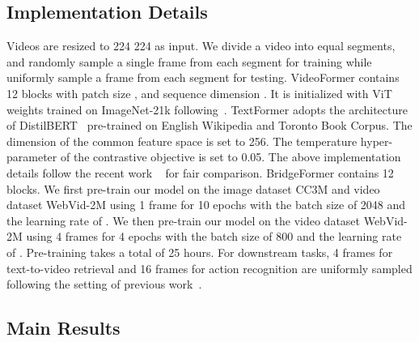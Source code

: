 \documentclass[10pt,twocolumn,letterpaper]{article}
\begin{document}
\subsection{Implementation Details}
Videos are resized to 224  224 as input. We divide a video into  equal segments, and randomly sample a single frame from each segment for training while uniformly sample a frame from each segment for testing. VideoFormer contains 12 blocks with patch size , and sequence dimension . It is initialized with ViT~\cite{vit} weights trained on ImageNet-21k following~\cite{frozen}. TextFormer adopts the architecture of DistilBERT~\cite{distilbert} pre-trained on English Wikipedia and Toronto Book Corpus.  The dimension of the common feature space is set to 256. The temperature hyper-parameter of the contrastive objective is set to 0.05. The above implementation details follow the recent work ~\cite{frozen} for fair comparison. BridgeFormer contains 12 blocks. We first pre-train our model on the image dataset CC3M and video dataset WebVid-2M using 1 frame for 10 epochs with the batch size of 2048 and the learning rate of . We then pre-train our model on the video dataset WebVid-2M using 4 frames for 4 epochs with the batch size of 800 and the learning rate of . Pre-training takes a total of 25 hours. For downstream tasks, 4 frames for text-to-video retrieval and 16 frames for action recognition are uniformly sampled following the setting of previous work~\cite{frozen, MIL-NCE}.



\subsection{Main Results}
\end{document}
